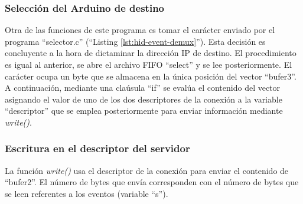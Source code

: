 \subsubsection{Selección del Arduino de destino}\label{s3_5_1_2}

Otra de las funciones de este programa es tomar el carácter enviado por el programa ``selector.c'' (``Listing \ref{lst:hid-event-demux}''). Esta decisión es concluyente a la hora de dictaminar la dirección IP de destino. El procedimiento es igual al anterior, se abre el archivo FIFO ``select'' y se lee posteriormente. El carácter ocupa un byte que se almacena en la única posición del vector ``bufer3''. A continuación, mediante una claúsula ``if'' se evalúa el contenido del vector asignando el valor de uno de los dos descriptores de la conexión a la variable ``descriptor'' que se emplea posteriormente para enviar información mediante {\itshape write()}.


\subsubsection{Escritura en el descriptor del servidor}\label{s3_5_1_3}

La función {\itshape write()} usa el descriptor de la conexión para enviar el contenido de ``bufer2''. El número de bytes que envía corresponden con el número de bytes que se leen referentes a los eventos (variable ``s''). 

